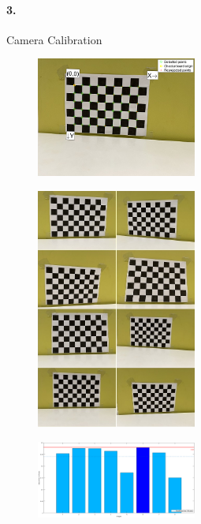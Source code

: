 \documentclass[10pt,twocolumn,letterpaper]{article}
\begin{document}
\paragraph{3.}Camera Calibration

\begin{figure}[h]
\begin{center}
   \includegraphics[width=0.47\textwidth]{3.4}
\end{center}
\end{figure}

\begin{figure}[h]
\begin{center}
   \includegraphics[width=0.47\textwidth]{C3.0}
\end{center}
\end{figure}

\begin{figure}[h]
\begin{center}
   \includegraphics[width=0.47\textwidth]{3.3}
\end{center}
\end{figure}
\end{document}
